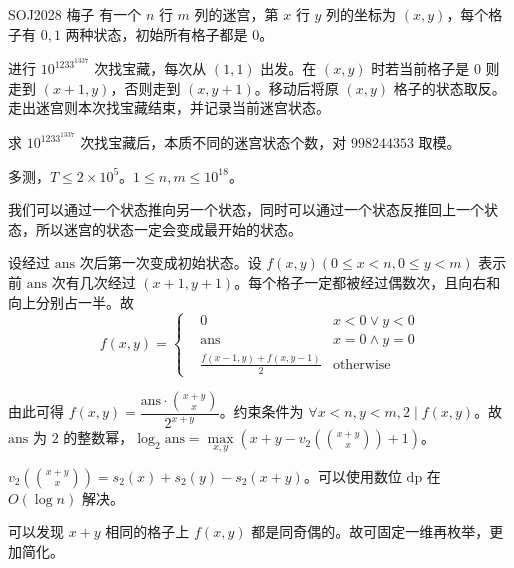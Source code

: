\documentclass[../main.tex]{subfiles}
\begin{document}
\subsubsection{}

\begin{frame}{SOJ2028 梅子}
有一个 $n$ 行 $m$ 列的迷宫，第 $x$ 行 $y$ 列的坐标为 $(x,y)$，每个格子有 $0,1$ 两种状态，初始所有格子都是 $0$。

进行 $10^{1233^{1337}}$ 次找宝藏，每次从 $(1,1)$ 出发。在 $(x,y)$ 时若当前格子是 $0$ 则走到 $(x+1,y)$，否则走到 $(x,y+1)$。移动后将原 $(x,y)$ 格子的状态取反。走出迷宫则本次找宝藏结束，并记录当前迷宫状态。

求 $10^{1233^{1337}}$ 次找宝藏后，本质不同的迷宫状态个数，对 $998244353$ 取模。

多测，$T\le2\times10^5$。$1\le n,m\le 10^{18}$。
\end{frame}

\begin{frame}
我们可以通过一个状态推向另一个状态，同时可以通过一个状态反推回上一个状态，所以迷宫的状态一定会变成最开始的状态。\pause

设经过 $\text{ans}$ 次后第一次变成初始状态。设 $f(x,y)(0\le x<n,0\le y<m)$ 表示前 $\text{ans}$ 次有几次经过 $(x+1,y+1)$。每个格子一定都被经过偶数次，且向右和向上分别占一半。故
$$
f(x,y)=
\left\{
\begin{aligned}
&0 &x<0\vee y<0\\
&\text{ans} &x=0\wedge y=0\\
&\frac{f(x-1,y)+f(x,y-1)}{2} &\text{otherwise}
\end{aligned}
\right.
$$
\end{frame}

\begin{frame}
由此可得 $f(x,y)=\dfrac{\text{ans}\cdot \binom{x+y}{x}}{2^{x+y}}$。约束条件为 $\forall x<n,y<m,2\mid f(x,y)$。故 $\text{ans}$ 为 $2$ 的整数幂，$\log_2\text{ans}=\max\limits_{x,y}(x+y-v_2\left(\binom{x+y}{x} \right)+1)$。\pause

$v_2\left(\binom{x+y}{x} \right)=s_2(x)+s_2(y)-s_2(x+y)$。可以使用数位 $\text{dp}$ 在 $O(\log n)$ 解决。\pause

可以发现 $x+y$ 相同的格子上 $f(x,y)$ 都是同奇偶的。故可固定一维再枚举，更加简化。
\end{frame}

\subsubsection{}
\end{document}
